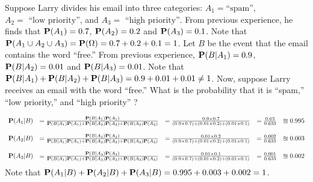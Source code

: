 \begin{example}[Wasserman2003~p.12]
Suppose Larry divides his email into three categories: $A_1 = \text{``spam''}$, $A_2 =\text{ ``low priority''}$, and $A_3 = \text{ ``high priority''}$.  From previous experience, he finds that $\mathbf{P}(A_1) = 0.7$, $\mathbf{P}(A_2) = 0.2$ and $\mathbf{P}(A_3)=0.1$.  Note that $\mathbf{P}(A_1 \cup A_2 \cup A_3) = \mathbf{P}(\Omega) = 0.7+0.2+0.1 = 1$.  Let $B$ be the event that the email contains the word ``free.''  From previous experience, $\mathbf{P}(B|A_1) = 0.9$, $\mathbf{P}(B|A_2) = 0.01$ and $\mathbf{P}(B|A_3)=0.01$.  Note that $\mathbf{P}(B|A_1) + \mathbf{P}(B|A_2) + \mathbf{P}(B|A_3) = 0.9+0.01+0.01 \neq 1$.  Now, suppose Larry receives an email with the word ``free.''  What is the probability that it is ``spam,'' ``low priority,''  and ``high priority'' ?

{\scriptsize{
\[
\begin{array}{l l l l l}
\mathbf{P}(A_1 | B) 
&= \frac{\mathbf{P}(B|A_1)\mathbf{P}(A_1)}{\mathbf{P}(B|A_1)\mathbf{P}(A_1)+\mathbf{P}(B|A_2)\mathbf{P}(A_2)+\mathbf{P}(B|A_3)\mathbf{P}(A_3)} 
&= \frac{0.9 \times 0.7}{(0.9 \times 0.7)+ (0.01 \times 0.2) + (0.01 \times 0.1)}
&= \frac{0.63}{0.633}
&\approxeq 0.995 \\
\\
\mathbf{P}(A_2 | B) 
&= \frac{\mathbf{P}(B|A_2)\mathbf{P}(A_2)}{\mathbf{P}(B|A_1)\mathbf{P}(A_1)+\mathbf{P}(B|A_2)\mathbf{P}(A_2)+\mathbf{P}(B|A_3)\mathbf{P}(A_3)} 
&= \frac{0.01 \times 0.2}{(0.9 \times 0.7)+ (0.01 \times 0.2) + (0.01 \times 0.1)}
&= \frac{0.002}{0.633}
&\approxeq 0.003 \\
\\
\mathbf{P}(A_3 | B) 
&= \frac{\mathbf{P}(B|A_3)\mathbf{P}(A_3)}{\mathbf{P}(B|A_1)\mathbf{P}(A_1)+\mathbf{P}(B|A_2)\mathbf{P}(A_2)+\mathbf{P}(B|A_3)\mathbf{P}(A_3)} 
&= \frac{0.01 \times 0.1}{(0.9 \times 0.7)+ (0.01 \times 0.2) + (0.01 \times 0.1)}
&= \frac{0.001}{0.633}
&\approxeq 0.002 \\
\end{array}
\]
Note that $\mathbf{P}(A_1|B) + \mathbf{P}(A_2|B)+\mathbf{P}(A_3|B) = 0.995+0.003+0.002=1$.
}}
\end{example}

